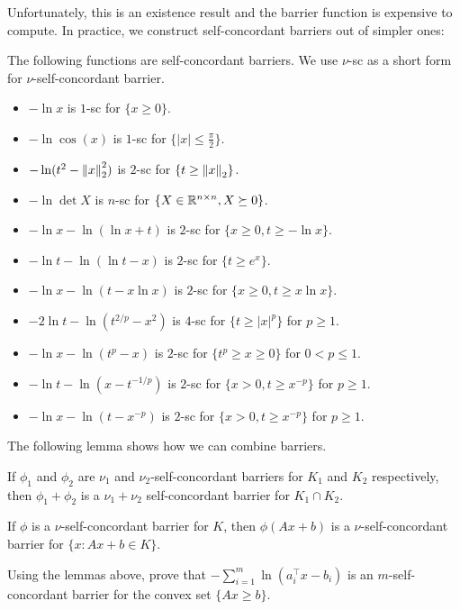 Unfortunately, this is an existence result and the barrier function
is expensive to compute. In practice, we construct self-concordant
barriers out of simpler ones:
\begin{lem}
The following functions are self-concordant barriers. We use $\nu$-sc
as a short form for $\nu$-self-concordant barrier.
\begin{itemize}
\item $-\ln x$ is $1$-sc for $\{x\geq0\}$.
\item $-\ln\cos(x)$ is $1$-sc for $\{\left|x\right|\leq\frac{\pi}{2}\}$.
\item $-\ln(t^{2}-\left\Vert x\right\Vert^{2}_{2})$ is $2$-sc for $\{t\geq\left\Vert x\right\Vert_{2}\}$.
\item $-\ln\det X$ is $n$-sc for $\{X\in\mathbb{R}^{n\times n},X\succeq0\}$.
\item $-\ln x-\ln(\ln x+t)$ is $2$-sc for $\{x\geq0,t\geq-\ln x\}$.
\item $-\ln t-\ln(\ln t-x)$ is $2$-sc for $\{t\geq e^{x}\}$.
\item $-\ln x-\ln(t-x\ln x)$ is $2$-sc for $\{x\geq0,t\geq x\ln x\}$.
\item $-2\ln t-\ln(t^{2/p}-x^{2})$ is $4$-sc for $\{t\geq|x|^{p}\}$ for
$p\geq1$.
\item $-\ln x-\ln(t^{p}-x)$ is $2$-sc for $\{t^{p}\geq x\geq0\}$ for
$0<p\leq1$.
\item $-\ln t-\ln(x-t^{-1/p})$ is $2$-sc for $\{x>0,t\geq x^{-p}\}$ for
$p\geq1$.
\item $-\ln x-\ln(t-x^{-p})$ is $2$-sc for $\{x>0,t\geq x^{-p}\}$ for
$p\geq1$.
\end{itemize}
\end{lem}

The following lemma shows how we can combine barriers.
\begin{lem}
If $\phi_{1}$ and $\phi_{2}$ are $\nu_{1}$ and $\nu_{2}$-self-concordant
barriers for $K_{1}$ and $K_{2}$ respectively, then $\phi_{1}+\phi_{2}$
is a $\nu_{1}+\nu_{2}$ self-concordant barrier for $K_{1}\cap K_{2}$.
\end{lem}

\begin{lem}
If $\phi$ is a $\nu$-self-concordant barrier for $K$, then $\phi(Ax+b)$
is a $\nu$-self-concordant barrier for $\{x:Ax+b\in K\}$.
\end{lem}

\begin{xca}
Using the lemmas above, prove that $-\sum^{m}_{i=1}\ln(a^{\top}_{i}x-b_{i})$
is an $m$-self-concordant barrier for the convex set $\{Ax\geq b\}$. 
\end{xca}


